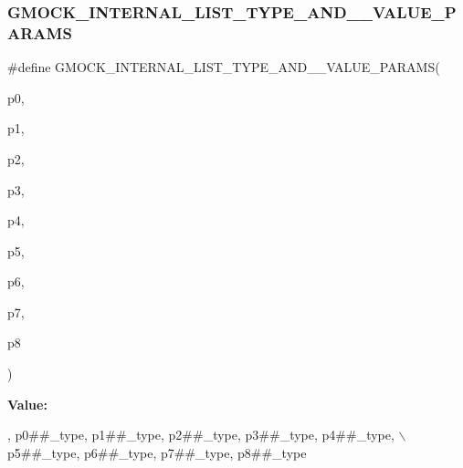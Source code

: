 \subsubsection{\texorpdfstring{G\+M\+O\+C\+K\+\_\+\+I\+N\+T\+E\+R\+N\+A\+L\+\_\+\+L\+I\+S\+T\+\_\+\+T\+Y\+P\+E\+\_\+\+A\+N\+D\+\_\+\_\+\+V\+A\+L\+U\+E\+\_\+\+P\+A\+R\+A\+MS}{GMOCK\_INTERNAL\_LIST\_TYPE\_AND\_9\_VALUE\_PARAMS}}
{\footnotesize\ttfamily \#define G\+M\+O\+C\+K\+\_\+\+I\+N\+T\+E\+R\+N\+A\+L\+\_\+\+L\+I\+S\+T\+\_\+\+T\+Y\+P\+E\+\_\+\+A\+N\+D\+\_\+\_\+\+V\+A\+L\+U\+E\+\_\+\+P\+A\+R\+A\+MS(\begin{DoxyParamCaption}\item[{}]{p0,  }\item[{}]{p1,  }\item[{}]{p2,  }\item[{}]{p3,  }\item[{}]{p4,  }\item[{}]{p5,  }\item[{}]{p6,  }\item[{}]{p7,  }\item[{}]{p8 }\end{DoxyParamCaption})}

{\bfseries Value\+:}
\begin{DoxyCode}
, p0##\_type, p1##\_type, p2##\_type, p3##\_type, p4##\_type, \(\backslash\)
    p5##\_type, p6##\_type, p7##\_type, p8##\_type
\end{DoxyCode}
